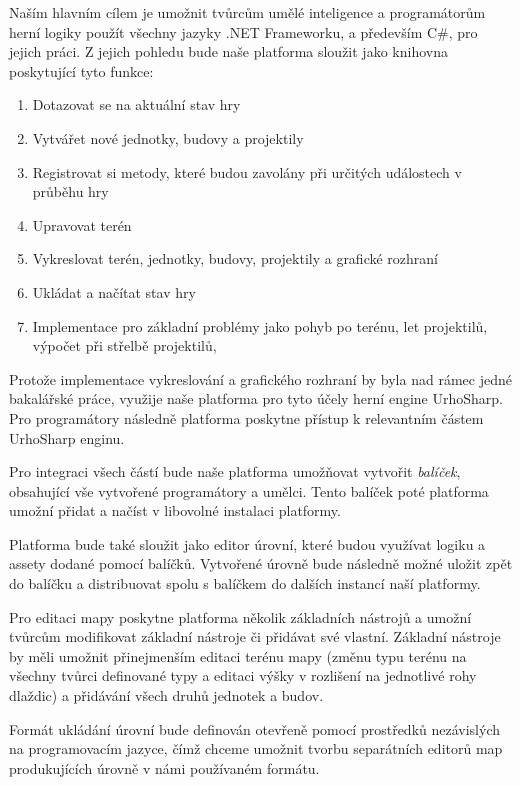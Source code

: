 Naším hlavním cílem je umožnit tvůrcům umělé inteligence a programátorům herní logiky použít všechny jazyky .NET Frameworku, a především C\#, pro jejich práci. Z jejich pohledu bude naše platforma sloužit jako knihovna poskytující tyto funkce:

\begin{enumerate}
	\item Dotazovat se na aktuální stav hry
	\item Vytvářet nové jednotky, budovy a projektily
	\item Registrovat si metody, které budou zavolány při určitých událostech v průběhu hry
	\item Upravovat terén
	\item Vykreslovat terén, jednotky, budovy, projektily a grafické rozhraní
	\item Ukládat a načítat stav hry
	\item Implementace pro základní problémy jako pohyb po terénu, let projektilů, výpočet při střelbě projektilů, 
\end{enumerate}

Protože implementace vykreslování a grafického rozhraní by byla nad rámec jedné bakalářské práce, využije naše platforma pro tyto účely herní engine UrhoSharp. Pro programátory následně platforma poskytne přístup k relevantním částem UrhoSharp enginu.

Pro integraci všech částí bude naše platforma umožňovat vytvořit \emph{balíček}, obsahující vše vytvořené programátory a umělci.  Tento balíček poté platforma umožní přidat a načíst v libovolné instalaci platformy.

Platforma bude také sloužit jako editor úrovní, které budou využívat logiku a assety dodané pomocí balíčků. Vytvořené úrovně bude následně možné uložit zpět do balíčku a distribuovat spolu s balíčkem do dalších instancí naší platformy.

Pro editaci mapy poskytne platforma několik základních nástrojů a umožní tvůrcům modifikovat základní nástroje či přidávat své vlastní. Základní nástroje by měli umožnit přinejmenším editaci terénu mapy (změnu typu terénu na všechny tvůrci definované typy a editaci výšky v rozlišení na jednotlivé rohy dlaždic) a přidávání všech druhů jednotek a budov.

Formát ukládání úrovní bude definován otevřeně pomocí prostředků nezávislých na programovacím jazyce, čímž chceme umožnit tvorbu separátních editorů map produkujících úrovně v námi používaném formátu.

